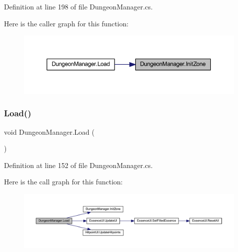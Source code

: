 Definition at line 198 of file Dungeon\+Manager.\+cs.

Here is the caller graph for this function\+:
\nopagebreak
\begin{figure}[H]
\begin{center}
\leavevmode
\includegraphics[width=350pt]{class_dungeon_manager_afc7ff9dc122b876f72a4f238496f3a26_icgraph}
\end{center}
\end{figure}
\mbox{\label{class_dungeon_manager_ac2c0ce668813e7b0a34b935364a5650f}} 
\subsubsection{\texorpdfstring{Load()}{Load()}}
{\footnotesize\ttfamily void Dungeon\+Manager.\+Load (\begin{DoxyParamCaption}{ }\end{DoxyParamCaption})}



Definition at line 152 of file Dungeon\+Manager.\+cs.

Here is the call graph for this function\+:
\nopagebreak
\begin{figure}[H]
\begin{center}
\leavevmode
\includegraphics[width=350pt]{class_dungeon_manager_ac2c0ce668813e7b0a34b935364a5650f_cgraph}
\end{center}
\end{figure}
\mbox{\label{class_dungeon_manager_af5da9360e25192d468c5e8461ff19f20}} 
